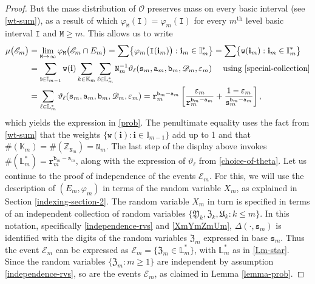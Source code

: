 \documentclass[12pt, twoside]{article}
\theoremstyle{definition}
\numberwithin{equation}{section}
\begin{document}
\begin{proof}
But the mass distribution of $\mathscr{O}$ preserves mass on every basic interval (see \eqref{wt-sum}), as a result of which $\varphi_{\mathtt M}(\mathtt I) = \varphi_{m}(\mathtt I)$ for every $m^{\text{th}}$ level basic interval $\mathtt I$ and $\mathtt M \geq m$. This allows us to write  
\begin{align*} 
\mu\bigl(\mathscr{E}_m \bigr) &= \lim_{\mathtt M \rightarrow \infty} \varphi_{\mathtt M} \bigl( \mathscr{E}_m \cap E_m \bigr) = \sum \bigl\{ \varphi_{m} \bigl(\mathtt I(\mathbf i_m) \bigr) : \mathbf i_m \in \mathbb I_m^{\ast} \bigr\} =  \sum \bigl\{ \mathtt w(\mathbf i_m): \mathbf i_m \in \mathbb I_m^{\ast} \bigr\} \\ 
&= \sum_{\mathbf i \in \mathbb I_{m-1}} \mathtt w(\mathbf i) \sum_{k \in \mathbb K_m} \sum_{\ell \in \mathbb L^{\ast}_m} \mathtt N_m^{-1} \vartheta_{\ell}(\mathtt s_m, \mathtt a_m, \mathtt b_m, \mathscr{D}_m, \varepsilon_m) \quad \text{ using \eqref{special-collection}} \\
&= \sum_{\ell \in \mathbb L_m^{\ast}} \vartheta_{\ell}(\mathtt s_m, \mathtt a_m, \mathtt b_m, \mathscr{D}_m, \varepsilon_m) = \mathtt r_m^{\mathtt b_m - \mathtt a_m} \left[ \frac{\varepsilon_m}{\mathtt r_m^{\mathtt b_m-\mathtt a_m}} + \frac{1 - \varepsilon_m}{\mathtt s_m^{\mathtt b_m-\mathtt a_m}}\right],  
 \end{align*}  
which yields the expression in \eqref{prob}. The penultimate equality uses the fact from \eqref{wt-sum} that the weights $\{\mathtt w(\mathbf i) : \mathbf i \in \mathbb I_{m-1}\}$ add up to 1 and that $\#(\mathbb K_m) = \#(\mathbb Z_{\mathtt N_m}) = \mathtt N_m$.  The last step of the display above invokes $\#(\mathbb L_m^{\ast}) = \mathtt r_m^{\mathtt b_m-\mathtt a_m}$, along with the expression of $\vartheta_{\ell}$ from \eqref{choice-of-theta}. 
\vskip0.1in
\noindent Let us continue to the proof of independence of the events $\mathscr{E}_m$. For this, we will use the description of $(E_m, \varphi_m)$  in terms of the random variable $X_m$, as explained in Section \ref{indexing-section-2}. The random variable $X_m$ in turn is specified in terms of an independent collection of random variables $\{\mathfrak Y_k, \mathfrak Z_k, \mathfrak U_k : k \leq m \}$. In this notation, specifically \eqref{independence-rvs} and \eqref{XmYmZmUm}, $\Delta(\cdot, \mathtt s_m)$ is identified with the digits of the random variables $\mathfrak Z_m$ expressed in base $\mathtt s_m$. Thus the event $\mathscr{E}_m$ can be expressed as $\mathscr{E}_m = \{\mathfrak Z_m \in \mathbb L_m^{\ast} \}$, with $\mathbb L_m^{\ast}$ as in \eqref{Lm-star}. Since the random variables $\{\mathfrak Z_m : m \geq 1\}$ are independent by assumption \eqref{independence-rvs}, so are the events $\mathscr{E}_m$, as claimed in Lemma \ref{lemma-prob}. 
\end{proof}
\end{document}
